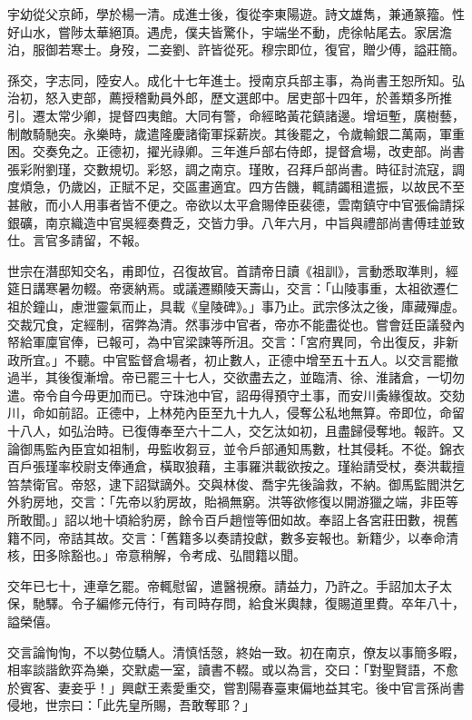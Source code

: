 \begin{pinyinscope}
宇幼從父京師，學於楊一清。成進士後，復從李東陽遊。詩文雄雋，兼通篆籀。性好山水，嘗陟太華絕頂。遇虎，僕夫皆驚仆，宇端坐不動，虎徐帖尾去。家居澹泊，服御若寒士。身歿，二妾劉、許皆從死。穆宗即位，復官，贈少傅，謚莊簡。

孫交，字志同，陸安人。成化十七年進士。授南京兵部主事，為尚書王恕所知。弘治初，怒入吏部，薦授稽勳員外郎，歷文選郎中。居吏部十四年，於善類多所推引。遷太常少卿，提督四夷館。大同有警，命經略黃花鎮諸邊。增垣塹，廣樹藝，制敵騎馳突。永樂時，歲遣隆慶諸衛軍採薪炭。其後罷之，令歲輸銀二萬兩，軍重困。交奏免之。正德初，擢光祿卿。三年進戶部右侍郎，提督倉場，改吏部。尚書張彩附劉瑾，交數規切。彩怒，調之南京。瑾敗，召拜戶部尚書。時征討流寇，調度煩急，仍歲凶，正賦不足，交區畫適宜。四方告饑，輒請蠲租遣振，以故民不至甚敝，而小人用事者皆不便之。帝欲以太平倉賜倖臣裴德，雲南鎮守中官張倫請採銀礦，南京織造中官吳經奏費乏，交皆力爭。八年六月，中旨與禮部尚書傅珪並致仕。言官多請留，不報。

世宗在潛邸知交名，甫即位，召復故官。首請帝日讀《祖訓》，言動悉取準則，經筵日講寒暑勿輟。帝褒納焉。或議遷顯陵天壽山，交言：「山陵事重，太祖欲遷仁祖於鐘山，慮泄靈氣而止，具載《皇陵碑》。」事乃止。武宗侈汰之後，庫藏殫虛。交裁冗食，定經制，宿弊為清。然事涉中官者，帝亦不能盡從也。嘗會廷臣議發內帑給軍廩官俸，已報可，為中官梁諫等所沮。交言：「宮府異同，令出復反，非新政所宜。」不聽。中官監督倉場者，初止數人，正德中增至五十五人。以交言罷撤過半，其後復漸增。帝已罷三十七人，交欲盡去之，並臨清、徐、淮諸倉，一切勿遣。帝令自今毋更加而已。守珠池中官，詔毋得預守土事，而安川夤緣復故。交劾川，命如前詔。正德中，上林苑內臣至九十九人，侵奪公私地無算。帝即位，命留十八人，如弘治時。已復傳奉至六十二人，交乞汰如初，且盡歸侵奪地。報許。又論御馬監內臣宜如祖制，毋監收芻豆，並令戶部通知馬數，杜其侵耗。不從。錦衣百戶張瑾率校尉支俸通倉，橫取狼藉，主事羅洪載欲按之。瑾紿請受杖，奏洪載擅笞禁衛官。帝怒，逮下詔獄謫外。交與林俊、喬宇先後論救，不納。御馬監閻洪乞外豹房地，交言：「先帝以豹房故，貽禍無窮。洪等欲修復以開游獵之端，非臣等所敢聞。」詔以地十頃給豹房，餘令百戶趙愷等佃如故。奉詔上各宮莊田數，視舊籍不同，帝詰其故。交言：「舊籍多以奏請投獻，數多妄報也。新籍少，以奉命清核，田多除豁也。」帝意稍解，令考成、弘間籍以聞。

交年已七十，連章乞罷。帝輒慰留，遣醫視療。請益力，乃許之。手詔加太子太保，馳驛。令子編修元侍行，有司時存問，給食米輿隸，復賜道里費。卒年八十，謚榮僖。

交言論恂恂，不以勢位驕人。清慎恬愨，終始一致。初在南京，僚友以事簡多暇，相率談諧飲弈為樂，交默處一室，讀書不輟。或以為言，交曰：「對聖賢語，不愈於賓客、妻妾乎！」興獻王素愛重交，嘗割陽春臺東偏地益其宅。後中官言孫尚書侵地，世宗曰：「此先皇所賜，吾敢奪耶？」


\end{pinyinscope}
